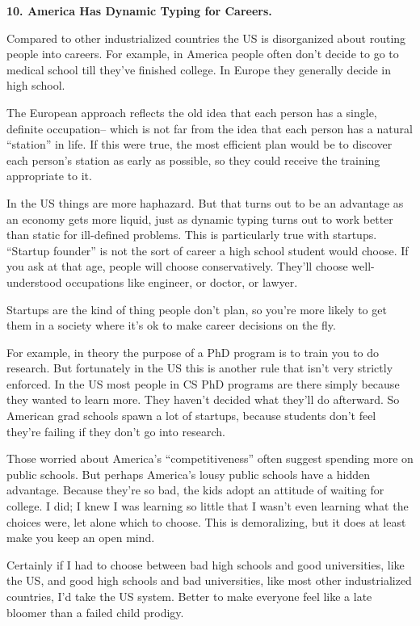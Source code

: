 \textbf{10. America Has Dynamic Typing for Careers.}

Compared to other industrialized countries the US is disorganized about
routing people into careers. For example, in America people often don't
decide to go to medical school till they've finished college. In Europe
they generally decide in high school.

The European approach reflects the old idea that each person has a
single, definite occupation-- which is not far from the idea that each
person has a natural ``station'' in life. If this were true, the most
efficient plan would be to discover each person's station as early as
possible, so they could receive the training appropriate to it.

In the US things are more haphazard. But that turns out to be an
advantage as an economy gets more liquid, just as dynamic typing turns
out to work better than static for ill-defined problems. This is
particularly true with startups. ``Startup founder'' is not the sort of
career a high school student would choose. If you ask at that age,
people will choose conservatively. They'll choose well-understood
occupations like engineer, or doctor, or lawyer.

Startups are the kind of thing people don't plan, so you're more likely
to get them in a society where it's ok to make career decisions on the
fly.

For example, in theory the purpose of a PhD program is to train you to
do research. But fortunately in the US this is another rule that isn't
very strictly enforced. In the US most people in CS PhD programs are
there simply because they wanted to learn more. They haven't decided
what they'll do afterward. So American grad schools spawn a lot of
startups, because students don't feel they're failing if they don't go
into research.

Those worried about America's ``competitiveness'' often suggest spending
more on public schools. But perhaps America's lousy public schools have
a hidden advantage. Because they're so bad, the kids adopt an attitude
of waiting for college. I did; I knew I was learning so little that I
wasn't even learning what the choices were, let alone which to choose.
This is demoralizing, but it does at least make you keep an open mind.

Certainly if I had to choose between bad high schools and good
universities, like the US, and good high schools and bad universities,
like most other industrialized countries, I'd take the US system. Better
to make everyone feel like a late bloomer than a failed child prodigy.


